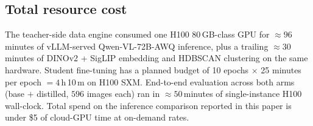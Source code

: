 \subsection{Total resource cost}
\label{sec:st:cost}

The teacher-side data engine consumed one H100 80\,GB-class GPU for
$\approx 96$\,minutes of vLLM-served Qwen-VL-72B-AWQ inference, plus a
trailing $\approx 30$\,minutes of DINOv2 + SigLIP embedding and HDBSCAN
clustering on the same hardware. Student fine-tuning has a planned budget
of 10 epochs $\times$ 25 minutes per epoch $= 4$\,h\,10\,m on H100 SXM.
End-to-end evaluation across both arms (base $+$ distilled, $596$ images
each) ran in $\approx 50$\,minutes of single-instance H100 wall-clock.
Total spend on the inference comparison reported in this paper is under
\$5 of cloud-GPU time at on-demand rates.
